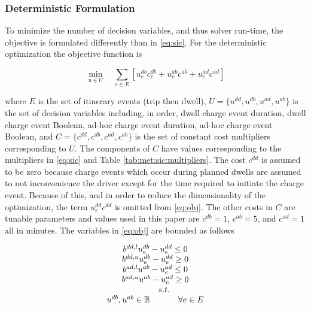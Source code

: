 \documentclass[letterpaper]{sae}
\begin{document}
\subsubsection{Deterministic Formulation}

To minimize the number of decision variables, and thus solver run-time, the objective is formulated differently than in \eqref{eq:sic}. For the deterministic optimization the objective function is

\begin{equation}
	\min_{u\in U}\quad \sum_{e\in E}[u_e^{db}c_e^{db}+u_e^{ab}c^{ab}+u_e^{ad}c^{ad}] \label{eq:obj}
\end{equation}

where $E$ is the set of itinerary events (trip then dwell), $U=\{u^{dd},u^{db},u^{ad},u^{ab}\}$ is the set of decision variables including, in order, dwell charge event duration, dwell charge event Boolean, ad-hoc charge event duration, ad-hoc charge event Boolean, and  $C=\{c^{dd},c^{db},c^{ad},c^{ab}\}$ is the set of constant cost multipliers corresponding to $U$. The components of $C$ have values corresponding to the multipliers in \eqref{eq:sic} and Table \ref{tab:met:sic:multipliers}. The cost $c^{dd}$ is assumed to be zero because charge events which occur during planned dwells are assumed to not inconvenience the driver except for the time required to initiate the charge event. Because of this, and in order to reduce the dimensionality of the optimization, the term $u_e^{dd}c^{dd}$ is omitted from \eqref{eq:obj}. The other costs in $C$ are tunable parameters and values used in this paper are $c^{db} = 1$, $c^{ab} = 5$, and $c^{ad} = 1$ all in minutes. The variables in \eqref{eq:obj} are bounded as follows

\begin{equation}
	\begin{array}{ccc}
		\multicolumn{3}{c}{b^{dd,l}u_{e}^{db}-u_{e}^{dd}\leq 0}\\
		\multicolumn{3}{c}{b^{dd,u}u_{e}^{db}-u_{e}^{dd}\geq 0}\\
		\multicolumn{3}{c}{b^{ad,l}u^{ab}-u_{e}^{ad}\leq 0}\\
		\multicolumn{3}{c}{b^{ad,u}u^{ab}-u_{e}^{ad}\geq 0}\\
		& s.t. & \\
		u^{db}, u^{ab}\in\mathbb{B} && \forall e\in E\\
	\end{array}
\end{equation}
\end{document}
